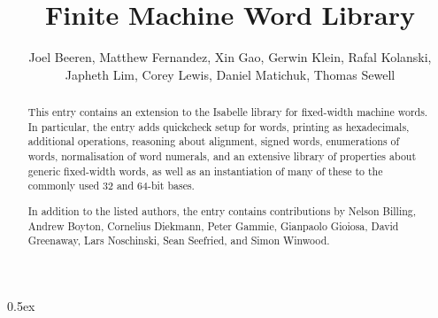 \documentclass[11pt,a4paper]{article}
\begin{document}
\title{Finite Machine Word Library}
\author{Joel Beeren, Matthew Fernandez, Xin Gao, Gerwin Klein, Rafal Kolanski,\\
       Japheth Lim, Corey Lewis, Daniel Matichuk, Thomas Sewell}
\maketitle

\begin{abstract}
  This entry contains an extension to the Isabelle library for fixed-width
  machine words. In particular, the entry adds quickcheck setup for words,
  printing as hexadecimals, additional operations, reasoning about alignment,
  signed words, enumerations of words, normalisation of word numerals, and an
  extensive library of properties about generic fixed-width words, as well as
  an instantiation of many of these to the commonly used 32 and 64-bit bases.

  In addition to the listed authors, the entry contains contributions by
  Nelson Billing, Andrew Boyton, Cornelius Diekmann, Peter Gammie, Gianpaolo
  Gioiosa, David Greenaway, Lars Noschinski, Sean Seefried, and Simon Winwood.
\end{abstract}

\tableofcontents

\parindent 0pt\parskip 0.5ex


\end{document}
